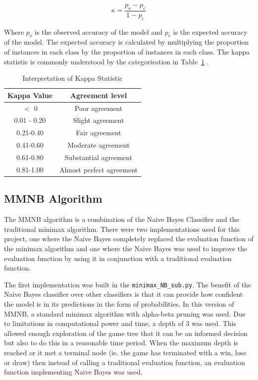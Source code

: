 \begin{equation}
    \label{eq:kappa}
    \kappa = \frac{p_o - p_e}{1 - p_e}
\end{equation}

Where $p_o$ is the observed accuracy of the model and $p_e$ is the expected accuracy of the model. The expected accuracy is calculated by multiplying the proportion of instances in each class by the proportion of instances in each class. The kappa statistic is commonly understood by the categorisation in Table~\ref{tab:kappa} \cite{landisMeasurementObserverAgreement1977}. 




\begin{table}
    \centering
    \begin{tabular}{|c|c|}
        \hline
        \textbf{Kappa Value} & \textbf{Agreement level} \\
        \hline
        $<$ 0 & Poor agreement \\
        0.01 - 0.20 & Slight agreement \\
        0.21-0.40 & Fair agreement \\
        0.41-0.60 & Moderate agreement \\
        0.61-0.80 & Substantial agreement \\
        0.81-1.00 & Almost perfect agreement \\
        \hline
    \end{tabular}
    \caption{Interpretation of Kappa Statistic}
    \label{tab:kappa}

\end{table}



\subsection{MMNB Algorithm}

The MMNB algorithm is a combination of the Naive Bayes Classifier and the traditional minimax algorithm. There were two implementations used for this project, one where the Naive Bayes completely replaced the evaluation function of the minimax algorithm and one where the Naive Bayes was used to improve the evaluation function by using it in conjunction with a traditional evaluation function. 

The first implementation was built in the \texttt{minimax\_NB\_sub.py}. The benefit of the Naive Bayes classifier over other classifiers is that it can provide how confident the model is in its predictions in the form of probabilities. In this version of MMNB, a standard minimax algorithm with alpha-beta pruning was used. Due to limitations in computational power and time, a depth of 3 was used. This allowed enough exploration of the game tree that it can be an informed decision but also to do this in a reasonable time period. When the maximum depth is reached or it met a terminal node (ie. the game has terminated with a win, lose or draw) then instead of calling a traditional evaluation function, an evaluation function implementing Naive Bayes was used. 

